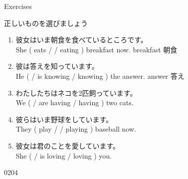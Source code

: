 \documentclass[aspectratio=169,xcolor={dvipsnames,table}]{beamer}
\newcommand{\myaudio}[1]{\href{#1}{\faVolumeUp}}
\begin{document}
\begin{frame}[plain]{Exercises}
 
正しいものを選びましょう

\begin{enumerate}
 \item 彼女はいま朝食を食べているところです。\\
She ( eats /  / eating ) breakfast now.%
\hfill{\scriptsize breakfast  朝食}
 \item 彼は答えを知っています。\\
He (  / is knowing / knowing ) the answer.%
\hfill{\scriptsize answer  答え}
 \item わたしたちはネコを2匹飼っています。\\
We (  / are having / having ) two cats.
 \item 彼らはいま野球をしています。\\
They ( play /  / playing ) baseball now.
 \item 彼女は君のことを愛しています。\\
She (  / is loving / loving ) you.
\end{enumerate}


\hfill{\tiny 0204}\,{\scriptsize \myaudio{./audio/021_is_ing_intro_05.mp3}}
\end{frame}
\end{document}
